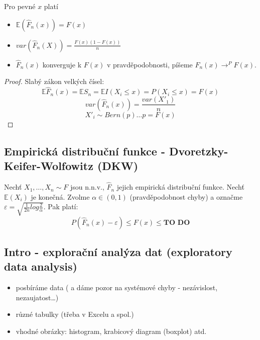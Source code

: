 \documentclass[../main.tex]{subfiles}
\begin{document}
\begin{theorem}
    Pro pevné $x$ platí
    \begin{itemize}
        \item $\mathbb{E}(\hat{F}_n(x)) = F(x)$
        \item $var(\hat{F}_n(X)) = \frac{F(x)(1-F(x))}{n}$
        \item $\hat{F}_n(x)$ konverguje k $F(x)$ v pravděpodobnosti, píšeme $\hat{F}_n(x)\rightarrow^P F(x)$.
    \end{itemize}
    \begin{proof}
        Slabý zákon velkých čísel:
        \[\mathbb{E}\hat{F}_n(x) = \mathbb{E}S_n = \mathbb{E}I(X_i \leq x) = P(X_i \leq x) = F(x)\]
        \[var(\hat{F}_n(x)) = \frac{var(X'_1)}{n}\]
        \[X'_i \sim Bern(p) \dots p=F(x)\]
    \end{proof}
\end{theorem}

\subsection{Empirická distribuční funkce - Dvoretzky-Keifer-Wolfowitz (DKW)}
\begin{theorem}
    Nechť $X_1,\dots,X_n \sim F$ jsou n.n.v., $\hat{F}_n$ jejich empirická distribuční funkce.
    Nechť $\mathbb{E}(X_i)$ je konečná. Zvolme $\alpha \in (0,1)$ (pravděpodobnost chyby) 
    a označme $\varepsilon = \sqrt{\frac{1}{2n}log \frac{2}{\alpha}}$. Pak platí:
    \[P(\hat{F}_n(x) - \varepsilon) \leq F(x) \leq \textbf{TO DO}\]
\end{theorem}
\subsection{Intro - explorační analýza dat (exploratory data analysis)}
\begin{itemize}
    \item posbíráme data ( a dáme pozor na systémové chyby - nezávislost, nezaujatost\dots)
    \item různé tabulky (třeba v Excelu a spol.)
    \item vhodné obrázky: histogram, krabicový diagram (boxplot) atd.
\end{itemize}
\end{document}
